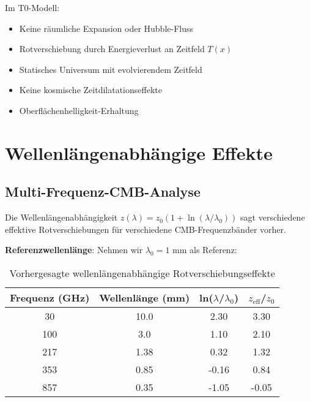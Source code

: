 \documentclass[12pt,a4paper]{article}
\newcommand{\Tfield}{T(x)}
\begin{document}
	\begin{tcolorbox}[colback=blue!5!white,colframe=blue!75!black,title=Fundamentaler Paradigma-Unterschied]
		Im T0-Modell:
		\begin{itemize}
			\item Keine räumliche Expansion oder Hubble-Fluss
			\item Rotverschiebung durch Energieverlust an Zeitfeld $\Tfield$
			\item Statisches Universum mit evolvierendem Zeitfeld
			\item Keine kosmische Zeitdilatationseffekte
			\item Oberflächenhelligkeit-Erhaltung
		\end{itemize}
	\end{tcolorbox}
	
	\section{Wellenlängenabhängige Effekte}
	\label{sec:wellenlaengenabhaengige_effekte}
	
	\subsection{Multi-Frequenz-CMB-Analyse}
	\label{subsec:multi_frequenz}
	
	Die Wellenlängenabhängigkeit $z(\lambda) = z_0(1 + \ln(\lambda/\lambda_0))$ sagt verschiedene effektive Rotverschiebungen für verschiedene CMB-Frequenzbänder vorher.
	
	\textbf{Referenzwellenlänge}: Nehmen wir $\lambda_0 = 1$ mm als Referenz:
	
	\begin{table}[htbp]
		\centering
		\begin{tabular}{|c|c|c|c|}
			\hline
			\textbf{Frequenz (GHz)} & \textbf{Wellenlänge (mm)} & \textbf{ln($\lambda$/$\lambda_0$)} & \textbf{$z_{\text{eff}}$/$z_0$} \\
			\hline
			30 & 10.0 & 2.30 & 3.30 \\
			100 & 3.0 & 1.10 & 2.10 \\
			217 & 1.38 & 0.32 & 1.32 \\
			353 & 0.85 & -0.16 & 0.84 \\
			857 & 0.35 & -1.05 & -0.05 \\
			\hline
		\end{tabular}
		\caption{Vorhergesagte wellenlängenabhängige Rotverschiebungseffekte}
		\label{tab:wellenlaengeneffekte}
	\end{table}
	
\end{document}
